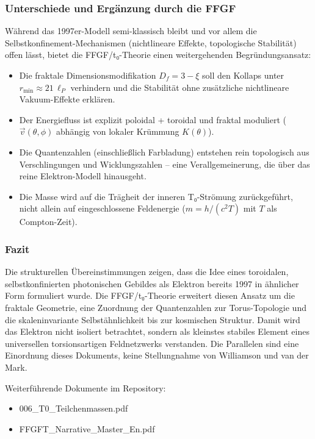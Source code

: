 	\subsubsection{Unterschiede und Ergänzung durch die FFGF}
	
	Während das 1997er-Modell semi-klassisch bleibt und vor allem die Selbstkonfinement-Mechanismen (nichtlineare Effekte, topologische Stabilität) offen lässt, bietet die FFGF/t₀-Theorie einen weitergehenden Begründungsansatz:
	
	\begin{itemize}
		\item Die fraktale Dimensionsmodifikation $D_f = 3 - \xi$ soll den Kollaps unter $r_{\min} \approx 21\,\ell_P$ verhindern und die Stabilität ohne zusätzliche nichtlineare Vakuum-Effekte erklären.
		\item Der Energiefluss ist explizit poloidal + toroidal und fraktal moduliert ($\vec{v}(\theta,\phi)$ abhängig von lokaler Krümmung $K(\theta)$).
		\item Die Quantenzahlen (einschließlich Farbladung) entstehen rein topologisch aus Verschlingungen und Wicklungszahlen – eine Verallgemeinerung, die über das reine Elektron-Modell hinausgeht.
		\item Die Masse wird auf die Trägheit der inneren T₀-Strömung zurückgeführt, nicht allein auf eingeschlossene Feldenergie ($m = h/(c^2 T)$ mit $T$ als Compton-Zeit).
	\end{itemize}
	
	\subsubsection{Fazit}
	
	Die strukturellen Übereinstimmungen zeigen, dass die Idee eines toroidalen, selbstkonfinierten photonischen Gebildes als Elektron bereits 1997 in ähnlicher Form formuliert wurde. Die FFGF/t₀-Theorie erweitert diesen Ansatz um die fraktale Geometrie, eine Zuordnung der Quantenzahlen zur Torus-Topologie und die skaleninvariante Selbstähnlichkeit bis zur kosmischen Struktur. Damit wird das Elektron nicht isoliert betrachtet, sondern als kleinstes stabiles Element eines universellen torsionsartigen Feldnetzwerks verstanden. Die Parallelen sind eine Einordnung dieses Dokuments, keine Stellungnahme von Williamson und van der Mark.
	
	Weiterführende Dokumente im Repository:
	\begin{itemize}
		\item 006\_T0\_Teilchenmassen.pdf
		\item FFGFT\_Narrative\_Master\_En.pdf
	\end{itemize}	
